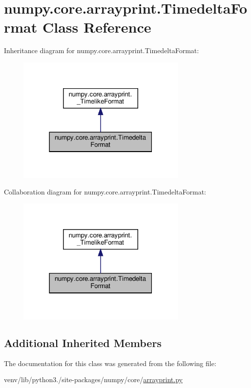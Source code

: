 \hypertarget{classnumpy_1_1core_1_1arrayprint_1_1TimedeltaFormat}{}\section{numpy.\+core.\+arrayprint.\+Timedelta\+Format Class Reference}
\label{classnumpy_1_1core_1_1arrayprint_1_1TimedeltaFormat}


Inheritance diagram for numpy.\+core.\+arrayprint.\+Timedelta\+Format\+:
\nopagebreak
\begin{figure}[H]
\begin{center}
\leavevmode
\includegraphics[width=237pt]{classnumpy_1_1core_1_1arrayprint_1_1TimedeltaFormat__inherit__graph}
\end{center}
\end{figure}


Collaboration diagram for numpy.\+core.\+arrayprint.\+Timedelta\+Format\+:
\nopagebreak
\begin{figure}[H]
\begin{center}
\leavevmode
\includegraphics[width=237pt]{classnumpy_1_1core_1_1arrayprint_1_1TimedeltaFormat__coll__graph}
\end{center}
\end{figure}
\subsection*{Additional Inherited Members}


The documentation for this class was generated from the following file\+:\begin{DoxyCompactItemize}
\item 
venv/lib/python3./site-\/packages/numpy/core/\hyperlink{core_2arrayprint_8py}{arrayprint.\+py}\end{DoxyCompactItemize}
